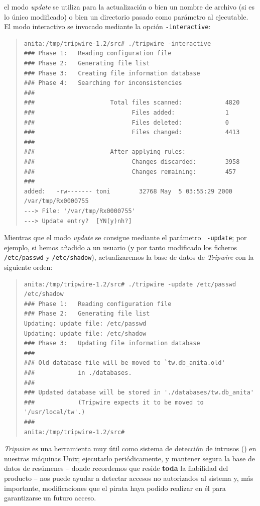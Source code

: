 el modo {\it update} se utiliza para la actualizaci\'on o bien un nombre de
archivo (si es lo \'unico modificado) o bien un directorio pasado como 
par\'ametro al ejecutable. El modo interactivo se invocado mediante la
opci\'on {\tt -interactive}:
\begin{quote}
\begin{verbatim}
anita:/tmp/tripwire-1.2/src# ./tripwire -interactive
### Phase 1:   Reading configuration file
### Phase 2:   Generating file list
### Phase 3:   Creating file information database
### Phase 4:   Searching for inconsistencies
###
###                     Total files scanned:            4820
###                           Files added:              1
###                           Files deleted:            0
###                           Files changed:            4413
###
###                     After applying rules:
###                           Changes discarded:        3958
###                           Changes remaining:        457
###
added:   -rw------- toni        32768 May  5 03:55:29 2000 /var/tmp/Rx0000755
---> File: '/var/tmp/Rx0000755'
---> Update entry?  [YN(y)nh?] 
\end{verbatim}
\end{quote}
Mientras que el modo {\it update} se consigue mediante el par\'ametro {\tt
-update}; por ejemplo, si hemos a\~nadido a un usuario (y por tanto modificado
los ficheros {\tt /etc/passwd} y {\tt /etc/shadow}), actualizaremos la base de 
datos de {\it Tripwire} con la siguiente orden:
\begin{quote}
\begin{verbatim}
anita:/tmp/tripwire-1.2/src# ./tripwire -update /etc/passwd /etc/shadow
### Phase 1:   Reading configuration file
### Phase 2:   Generating file list
Updating: update file: /etc/passwd
Updating: update file: /etc/shadow
### Phase 3:   Updating file information database
###
### Old database file will be moved to `tw.db_anita.old'
###            in ./databases.
###
### Updated database will be stored in './databases/tw.db_anita'
###            (Tripwire expects it to be moved to '/usr/local/tw'.)
###
anita:/tmp/tripwire-1.2/src# 
\end{verbatim}
\end{quote}
{\it Tripwire} es una herramienta muy \'util como sistema de detecci\'on de
intrusos (\cite{kn:kim94a}) en nuestras m\'aquinas Unix; ejecutarlo 
peri\'odicamente, y mantener segura la base de datos de res\'umenes -- donde
recordemos que 
reside {\bf toda} la fiabilidad del producto -- nos puede ayudar a detectar
accesos no autorizados al sistema y, m\'as importante, modificaciones que el
pirata haya podido realizar en \'el para garantizarse un futuro acceso.
